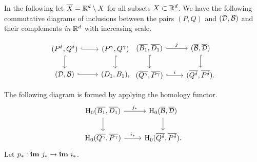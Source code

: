 
In the following let $\overline{X} = \mathbb{R}^d\setminus X$ for all subsets $X\subset\mathbb{R}^d$.
We have the following commutative diagrams of inclusions between the pairs $(P,Q)$ and $({\mathcal{D}}, {\mathcal{B}})$ and their complements \emph{in $\mathbb{R}^d$} with increasing scale.

\[ \begin{tikzcd}
  (P^\delta, Q^\delta) \arrow[hookrightarrow]{r}\arrow[hookrightarrow]{d} &
  (P^\gamma, Q^\gamma) \arrow[hookrightarrow]{d} \\
  (\D, \B) \arrow[hookrightarrow]{r} &
  (D_1, B_1),
\end{tikzcd}\begin{tikzcd}
  (\overline{B_1}, \overline{D_1})\arrow[hookrightarrow]{r}{j}\arrow[hookrightarrow]{d} &
  (\overline{\B}, \overline{\D}) \arrow[hookrightarrow]{d}\\
  (\overline{Q^\gamma}, \overline{P^\gamma}) \arrow[hookrightarrow]{r}{i} &
  (\overline{Q^\delta}, \overline{P^\delta}).
\end{tikzcd}\]

The following diagram is formed by applying the homology functor.
\begin{equation}\label{dgm:1}\begin{tikzcd}
    \hom_0(\overline{B_1}, \overline{D_1})\arrow{r}{j_*}\arrow{d} &
    \hom_0(\overline{\B}, \overline{\D}) \arrow{d} \\
    \hom_0(\overline{Q^\gamma}, \overline{P^\gamma}) \arrow{r}{i_*} &
    \hom_0(\overline{Q^\delta}, \overline{P^\delta}).
\end{tikzcd}\end{equation}
Let $p_* : \mathbf{im}~j_*\to\mathbf{im}~i_*$.

%

